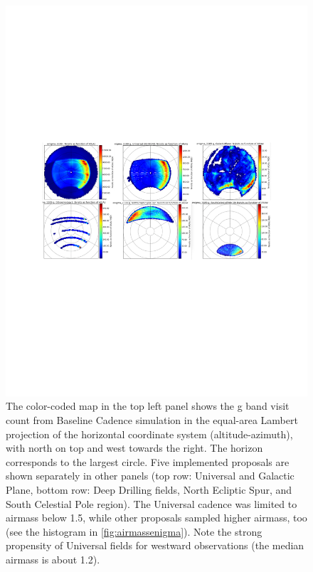 \begin{figure}[t!]
\vskip -3.5in
\hskip -0.5in
\includegraphics[angle=0,width=1.19\hsize:,clip]{figs/aaAllp.pdf}
\vskip -3.5in
\caption{The color-coded map in the top left panel shows the g band visit count from
Baseline Cadence simulation  in the equal-area Lambert projection of the
horizontal coordinate system (altitude-azimuth), with north on top and west towards the
right. The horizon corresponds to the largest circle. Five implemented proposals are shown
separately in other panels (top row: Universal and Galactic Plane, bottom row: Deep Drilling
fields, North Ecliptic Spur, and South Celestial Pole region). The Universal cadence was
limited to airmass below 1.5, while other proposals sampled higher airmass, too (see the
histogram in \autoref{fig:airmassenigma}).  Note the strong propensity of Universal fields
for westward observations (the median airmass is about 1.2).}
\label{fig:AltAzenigma}
\end{figure}

